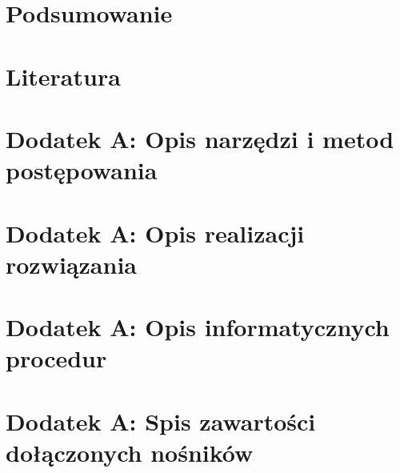 \documentclass[11pt,a4paper]{article}
\begin{document}
\section{Podsumowanie}

\section{Literatura}

\section{Dodatek A: Opis narzędzi i metod postępowania}
\section{Dodatek A: Opis realizacji rozwiązania}
\section{Dodatek A: Opis informatycznych procedur}
\section{Dodatek A: Spis zawartości dołączonych nośników}
\end{document}
